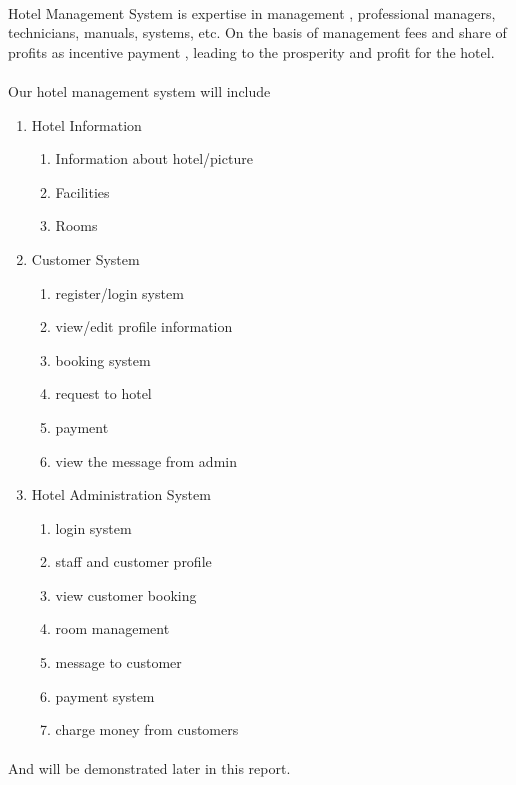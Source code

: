 \paragraph{}
 Hotel Management System is expertise in management , professional managers, technicians, manuals, systems, etc. On the basis of management fees and share of profits as incentive payment , leading to the prosperity and profit for the hotel.
 \paragraph{}
 Our hotel management system will include
\begin{enumerate}
	\item Hotel Information
	\begin{enumerate}
		\item Information about hotel/picture
		\item Facilities
		\item Rooms
	\end{enumerate}

	\item Customer System
	\begin{enumerate}
		\item register/login system
		\item view/edit profile information
		\item booking system
		\item request to hotel
		\item payment
		\item view the message from admin
	\end{enumerate}

	\item Hotel Administration System
	\begin{enumerate}
	 	\item login system
    		\item staff and customer profile
    		\item view customer booking
 		\item room management
    		\item message to customer
    		\item payment system
		\item charge money from customers
	\end{enumerate}
\end{enumerate}
\paragraph{}
    And will be demonstrated later in this report.
